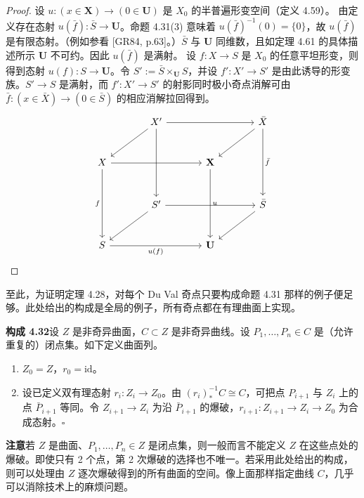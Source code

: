 \begin{proof}
设 $u\colon (x\in\mathbf{X})\to(0\in\mathbf{U})$ 是 $X_0$ 的半普遍形变空间（定义 4.59）。
由定义存在态射 $u(\bar f)\colon\bar S\to\mathbf{U}$。命题 4.31(3) 意味着 $u(\bar f)^{-1}(0)=\{0\}$，故 $u(\bar f)$ 是有限态射。（例如参看 [GR84, p.63]。）$\bar S$ 与 $\mathbf{U}$ 同维数，且如定理 4.61 的具体描述所示 $\mathbf{U}$ 不可约。因此 $u(\bar f)$ 是满射。
设 $f\colon X\to S$ 是 $X_0$ 的任意平坦形变，则得到态射 $u(f)\colon S\to\mathbf{U}$。令 $S':=\bar S\times_{\mathbf{U}}S$，并设 $f'\colon X'\to S'$ 是由此诱导的形变族。$S'\to S$ 是满射，而 $f'\colon X'\to S'$ 的射影同时极小奇点消解可由 $\bar f\colon (x\in\bar X)\to(0\in\bar S)$ 的相应消解拉回得到。
\[
\begin{tikzcd}[row sep=large,column sep=large]
 & X' \arrow[rr] \arrow[dl] \arrow[dd] & & \bar X \arrow[dl] \arrow[dd,"\bar f"] \\
X \arrow[rr] \arrow[dd,"f"'] & & \mathbf{X} \arrow[dd,"u"] & \\
 & S' \arrow[dl] \arrow[rr] & & \bar S \arrow[dl] \\
S \arrow[rr,"u(f)"'] & & \mathbf{U} &
\end{tikzcd}
\]
\end{proof}

至此，为证明定理 4.28，对每个 Du Val 奇点只要构成命题 4.31 那样的例子便足够。此处给出的构成是全局的例子，所有奇点都在有理曲面上实现。


\par\medskip\noindent\textbf{构成 4.32}\quad 设 $Z$ 是非奇异曲面，$C\subset Z$ 是非奇异曲线。设 $P_1,\dots,P_n\in C$ 是（允许重复的）闭点集。如下定义曲面列。
\begin{enumerate}[label=(\arabic*),leftmargin=*]
\item $Z_0=Z$，$r_0=\mathrm{id}$。
\item 设已定义双有理态射 $r_i\colon Z_i\to Z_0$。由 $(r_i)_*^{-1}C\cong C$，可把点 $P_{i+1}$ 与 $Z_i$ 上的点 $\bar P_{i+1}$ 等同。令 $Z_{i+1}\to Z_i$ 为沿 $\bar P_{i+1}$ 的爆破，$r_{i+1}\colon Z_{i+1}\to Z_i\to Z_0$ 为合成态射。\hfill$\square$
\end{enumerate}

\par\medskip\noindent\textbf{注意}\quad 若 $Z$ 是曲面、$P_1,\dots,P_n\in Z$ 是闭点集，则一般而言不能定义 $Z$ 在这些点处的爆破。即使只有 2 个点，第 2 次爆破的选择也不唯一。若采用此处给出的构成，则可以处理由 $Z$ 逐次爆破得到的所有曲面的空间。像上面那样指定曲线 $C$，几乎可以消除技术上的麻烦问题。

